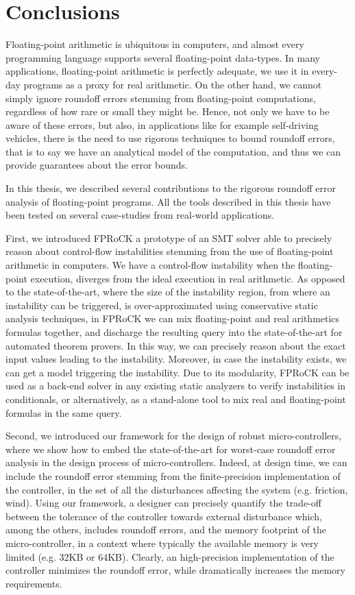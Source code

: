 
\chapter{Conclusions}
\label{sec:conclusion}
%
Floating-point arithmetic is ubiquitous in computers, and almost every programming language supports several floating-point data-types.
%
In many applications, floating-point arithmetic is perfectly adequate, we use it in every-day programs as a proxy for real arithmetic.
%
On the other hand, we cannot simply ignore roundoff errors stemming from floating-point computations, regardless of how rare or small they might be.
%
Hence, not only we have to be aware of these errors, but also, in applications like for example self-driving vehicles, there is the need to use rigorous techniques to bound roundoff errors, that is to say we have an analytical model of the computation, and thus we can provide guarantees about the error bounds.
%

In this thesis, we described several contributions to the rigorous roundoff error analysis of floating-point programs.
%
All the tools described in this thesis have been tested on several case-studies from real-world applications.
%

First, we introduced FPRoCK a prototype of an SMT solver able to precisely reason about control-flow instabilities stemming from the use of floating-point arithmetic in computers.
%
We have a control-flow instability when the floating-point execution, diverges from the ideal execution in real arithmetic.
%
As opposed to the state-of-the-art, where the size of the instability region, from where an instability can be triggered, is over-approximated using conservative static analysis techniques, in FPRoCK we can mix floating-point and real arithmetics formulas together, and discharge the resulting query into the state-of-the-art for automated theorem provers. 
%
In this way, we can precisely reason about the exact input values leading to the instability. 
%
Moreover, in case the instability exists, we can get a model triggering the instability.
%
Due to its modularity, FPRoCK can be used as a back-end solver in any existing static analyzers to verify instabilities in conditionals, or alternatively, as a stand-alone tool to mix real and floating-point formulas in the same query.
%

Second, we introduced our framework for the design of robust micro-controllers, where we show how to embed the state-of-the-art for worst-case roundoff error analysis in the design process of micro-controllers.
%
Indeed, at design time, we can include the roundoff error stemming from the finite-precision implementation of the controller, in the set of all the disturbances affecting the system (e.g. friction, wind).
%
Using our framework, a designer can precisely quantify the trade-off between the tolerance of the controller towards external disturbance which, among the others, includes roundoff errors, and the memory footprint of the micro-controller, in a context where typically the available memory is very limited (e.g. 32KB or 64KB).
%
Clearly, an high-precision implementation of the controller minimizes the roundoff error, while dramatically increases the memory requirements. 
%

